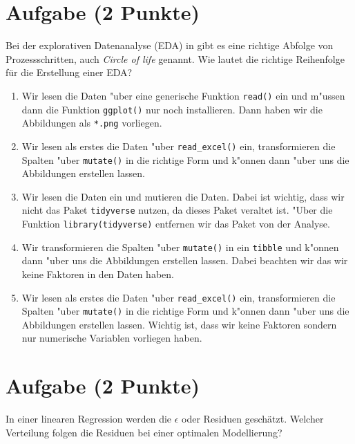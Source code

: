 \documentclass[a4paper, 10pt]{scrartcl}\usepackage[]{graphicx}\usepackage[]{xcolor}
\begin{document}
\section{Aufgabe \hfill (2 Punkte)}

Bei der explorativen Datenanalyse (EDA) in \Rlogo gibt es eine richtige Abfolge von Prozessschritten, auch \textit{Circle of life} genannt. Wie lautet die richtige Reihenfolge f{\"u}r die Erstellung einer EDA?



\begin{enumerate}
\item [\textbf{A} \msquare] Wir lesen die Daten {"u}ber eine generische Funktion \texttt{read()} ein und m{"u}ssen dann die Funktion \texttt{ggplot()} nur noch installieren. Dann haben wir die Abbildungen als \texttt{*.png} vorliegen.
\item [\textbf{B} \msquare] Wir lesen als erstes die Daten {"u}ber \texttt{read\_excel()} ein, transformieren die Spalten {"u}ber \texttt{mutate()} in die richtige Form und k{"o}nnen dann {"u}ber  uns die Abbildungen erstellen lassen.
\item [\textbf{C} \msquare] Wir lesen die Daten ein und mutieren die Daten. Dabei ist wichtig, dass wir nicht das Paket \texttt{tidyverse} nutzen, da dieses Paket veraltet ist. {"U}ber die Funktion \texttt{library(tidyverse)} entfernen wir das Paket von der Analyse.
\item [\textbf{D} \msquare] Wir transformieren die Spalten {"u}ber \texttt{mutate()} in ein \texttt{tibble} und k{"o}nnen dann {"u}ber  uns die Abbildungen erstellen lassen. Dabei beachten wir das wir keine Faktoren in den Daten haben.
\item [\textbf{E} \msquare] Wir lesen als erstes die Daten {"u}ber \texttt{read\_excel()} ein, transformieren die Spalten {"u}ber \texttt{mutate()} in die richtige Form und k{"o}nnen dann  {"u}ber  uns die Abbildungen erstellen lassen. Wichtig ist, dass wir keine Faktoren sondern nur numerische Variablen vorliegen haben.
\end{enumerate}

\section{Aufgabe \hfill (2 Punkte)}

In einer linearen Regression werden die $\epsilon$ oder Residuen
gesch{\"a}tzt. Welcher Verteilung folgen die Residuen bei einer optimalen
Modellierung? 
\end{document}

